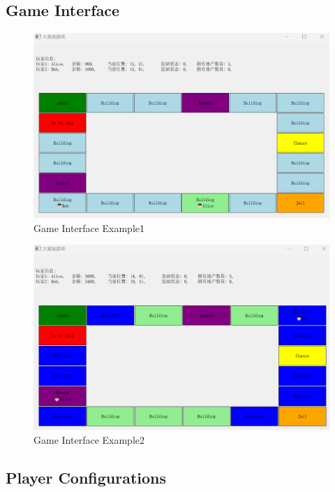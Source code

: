 \documentclass{article}
\begin{document}
\subsection{Game Interface}
\begin{figure}[H]
    \centering
         \includegraphics[width=\linewidth]{figures/Game_Interface1.png}
         \caption{Game Interface Example1}
         \label{fig:Game_Interface1}
\end{figure}

\begin{figure}[H]
    \centering
         \includegraphics[width=\linewidth]{figures/Game_Interface2.png}
         \caption{Game Interface Example2}
         \label{fig:Game_Interface2}
\end{figure}

\subsection{Player Configurations}
\end{document}
